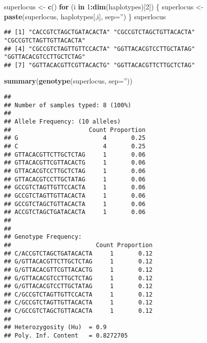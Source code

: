 \documentclass[
]{article}
\newenvironment{Shaded}{\begin{snugshade}}{\end{snugshade}}
\newcommand{\ControlFlowTok}[1]{\textcolor[rgb]{0.13,0.29,0.53}{\textbf{#1}}}
\newcommand{\DataTypeTok}[1]{\textcolor[rgb]{0.13,0.29,0.53}{#1}}
\newcommand{\DecValTok}[1]{\textcolor[rgb]{0.00,0.00,0.81}{#1}}
\newcommand{\KeywordTok}[1]{\textcolor[rgb]{0.13,0.29,0.53}{\textbf{#1}}}
\newcommand{\NormalTok}[1]{#1}
\newcommand{\OperatorTok}[1]{\textcolor[rgb]{0.81,0.36,0.00}{\textbf{#1}}}
\newcommand{\StringTok}[1]{\textcolor[rgb]{0.31,0.60,0.02}{#1}}
\begin{document}
\begin{Shaded}
\begin{Highlighting}[]
\NormalTok{superlocus <-}\StringTok{ }\KeywordTok{c}\NormalTok{()}
\ControlFlowTok{for}\NormalTok{ (i }\ControlFlowTok{in} \DecValTok{1}\OperatorTok{:}\KeywordTok{dim}\NormalTok{(haplotypes)[}\DecValTok{2}\NormalTok{]) \{}
\NormalTok{  superlocus <-}\StringTok{ }\KeywordTok{paste}\NormalTok{(superlocus, haplotypes[,i], }\DataTypeTok{sep=}\StringTok{''}\NormalTok{)}
\NormalTok{\}}
\NormalTok{superlocus}
\end{Highlighting}
\end{Shaded}

\begin{verbatim}
## [1] "CACCGTCTAGCTGATACACTA" "CGCCGTCTAGCTGTTACACTA" "CGCCGTCTAGTTGTTACACTA"
## [4] "CGCCGTCTAGTTGTTCCACTA" "GGTTACACGTCCTTGCTATAG" "GGTTACACGTCCTTGCTCTAG"
## [7] "GGTTACACGTTCGTTACACTG" "GGTTACACGTTCTTGCTCTAG"
\end{verbatim}

\begin{Shaded}
\begin{Highlighting}[]
\KeywordTok{summary}\NormalTok{(}\KeywordTok{genotype}\NormalTok{(superlocus, }\DataTypeTok{sep=}\StringTok{''}\NormalTok{))}
\end{Highlighting}
\end{Shaded}

\begin{verbatim}
## 
## Number of samples typed: 8 (100%)
## 
## Allele Frequency: (10 alleles)
##                      Count Proportion
## G                        4       0.25
## C                        4       0.25
## GTTACACGTTCTTGCTCTAG     1       0.06
## GTTACACGTTCGTTACACTG     1       0.06
## GTTACACGTCCTTGCTCTAG     1       0.06
## GTTACACGTCCTTGCTATAG     1       0.06
## GCCGTCTAGTTGTTCCACTA     1       0.06
## GCCGTCTAGTTGTTACACTA     1       0.06
## GCCGTCTAGCTGTTACACTA     1       0.06
## ACCGTCTAGCTGATACACTA     1       0.06
## 
## 
## Genotype Frequency:
##                        Count Proportion
## C/ACCGTCTAGCTGATACACTA     1       0.12
## G/GTTACACGTTCTTGCTCTAG     1       0.12
## G/GTTACACGTTCGTTACACTG     1       0.12
## G/GTTACACGTCCTTGCTCTAG     1       0.12
## G/GTTACACGTCCTTGCTATAG     1       0.12
## C/GCCGTCTAGTTGTTCCACTA     1       0.12
## C/GCCGTCTAGTTGTTACACTA     1       0.12
## C/GCCGTCTAGCTGTTACACTA     1       0.12
## 
## Heterozygosity (Hu)  = 0.9
## Poly. Inf. Content   = 0.8272705
\end{verbatim}
\end{document}
